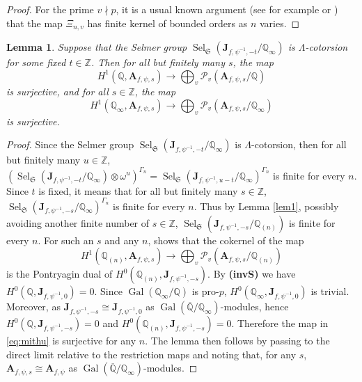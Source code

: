 \documentclass{amsart}
\newcommand{\Q}{\mathbb{Q}}
\newcommand{\Z}{\mathbb{Z}}
\newcommand{\fS}{\mathfrak{S}}
\newcommand{\bJ}{\mathbf{J}}
\newcommand{\bA}{\mathbf{A}}
\newcommand{\Gal}{\operatorname{Gal}}
\newcommand{\Sel}{\operatorname{Sel}}
\newtheorem{auxiliary proposition}[theorem]{Auxiliary Proposition}
\newtheorem{lemma}[theorem]{Lemma}
\newtheorem{main conjecture}[theorem]{Main Conjecture}
\newtheorem{main theorem}[theorem]{Main Theorem}
\newtheorem{modesty proposition}[theorem]{Modesty Proposition}
\newtheorem{open problem}[theorem]{Open Problem}
\newtheorem{convergence lemma}[theorem]{Convergence Lemma}
\newtheorem{corrected lemma}[theorem]{Corrected Lemma}
\newtheorem{growth lemma}[theorem]{Growth Lemma}
\newtheorem{coefficient lemma}[theorem]{Integrality Lemma}
\newtheorem{interpolation lemma}[theorem]{Interpolation Lemma}
\newtheorem{kernel lemma}[theorem]{Kernel Lemma}
\newtheorem{limit lemma}[theorem]{Limit Lemma}
\newtheorem{tandem lemma}[theorem]{Modesty Lemma}
\newtheorem{zero-finding lemma}[theorem]{Zero-Finding Lemma}
\begin{document}
\begin{proof}
 For the prime $v \nmid p$, it is a usual known argument (see for example \cite[page 1645, proof of Lemma 2.3]{ponsinet} or \cite[second paragraph of page 1275]{HatleyLei19}) that the map $\Xi_{n,v}$ has finite kernel of bounded orders as $n$ varies. 
\end{proof}

\begin{lemma}\label{lem: first}
  Suppose that the Selmer group $\Sel_{\fS}(\bJ_{f, \psi^{-1}, -t}/\Q_\infty)$ is $\Lambda$-cotorsion for some fixed $t \in \Z$.    Then for all but finitely many $s$, the map 
    $$H^1(\Q,\bA_{f, \psi,s}) \rightarrow  \bigoplus_{v}\mathcal{P}_{v}(\bA_{f, \psi,s}/\Q ) $$
    is surjective, and for all $s \in \Z$, the map 
     $$H^1(\Q_\infty,\bA_{f, \psi,s}) \rightarrow  \bigoplus_{v}\mathcal{P}_{v}(\bA_{f, \psi,s}/\Q_\infty ) $$
     is surjective.
\end{lemma}
\begin{proof}
    Since the Selmer group $\Sel_{\fS}(\bJ_{f, \psi^{-1},-t}/\Q_\infty)$ is $\Lambda$-cotorsion, then for all but finitely many $u\in \Z$, $(\Sel_{\fS}(\bJ_{f, \psi^{-1},-t}/\Q_\infty) \otimes \omega^u)^{\Gamma_n}=\Sel_{\fS}(\bJ_{f, \psi^{-1},u-t}/\Q_\infty)^{\Gamma_n}$ is finite for every $n$. Since $t$ is fixed, it means that for all but finitely many $s \in \Z$, $\Sel_{\fS}(\bJ_{f,\psi^{-1},-s}/\Q_\infty)^{\Gamma_n}$ is finite for every $n$. Thus by Lemma \ref{lem1}, possibly avoiding another finite number of $s \in \Z$, $\Sel_{\fS}(\bJ_{f,\psi^{-1},-s}/\Q_{(n)})$ is finite for every $n$. For such an $s$ and any $n$, \cite[Proposition 4.13]{Greenberg} shows that the cokernel of the map 
    \begin{equation}\label{eq:mithu}
    H^1(\Q_{(n)},\bA_{f, \psi,s}) \rightarrow  \bigoplus_{v}\mathcal{P}_{v}(\bA_{f, \psi,s}/\Q_{(n)} ) 
    \end{equation}
    is the Pontryagin dual of $H^0(\Q_{(n)},\bJ_{f,\psi^{-1},-s}).$  By \textbf{(invS)}  we have $H^0(\Q, \bJ_{f, \psi^{-1},0})=0$. Since $\Gal(\Q_\infty/\Q)$ is pro-$p$,   $H^0(\Q_\infty, \bJ_{f, \psi^{-1},0})$ is trivial. Moreover, as  $\bJ_{f,\psi^{-1},-s} \cong  \bJ_{f, \psi^{-1},0}$ as $\Gal(\overline{\Q}/\Q_\infty)$-modules, hence $H^0(\Q, \bJ_{f,\psi^{-1},-s})=0$ and $H^0(\Q_{(n)}, \bJ_{f,\psi^{-1},-s})=0$.
Therefore the map in \eqref{eq:mithu} is surjective for any $n$. The lemma then follows by passing to the direct limit relative to the restriction maps and noting that, for any $s$,  $\bA_{f, \psi, s} \cong \bA_{f, \psi}$ as $\Gal(\overline{\Q}/\Q_\infty)$-modules.
\end{proof}
\end{document}
